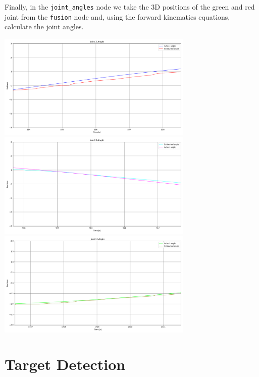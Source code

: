 \documentclass[11pt]{article}
\begin{document}
\noindent Finally, in the \texttt{joint\_angles} node we take the 3D positions of the green and red joint from the \texttt{fusion} node and, using the forward kinematics equations, calculate the joint angles.

\begin{center}
    \includegraphics[width=0.7\textwidth]{theta-2} \\
    \includegraphics[width=0.7\textwidth]{theta-3} \\
    \includegraphics[width=0.7\textwidth]{theta-4} \\
\end{center}

\section{Target Detection}
\end{document}
